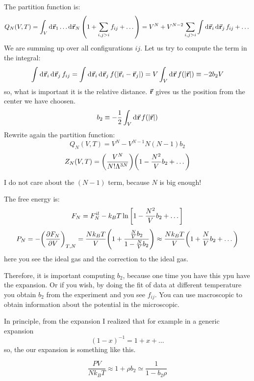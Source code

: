 \documentclass[../main/main.tex]{subfiles}
\begin{document}
The partition function is:
\begin{equation}
  Q_N (V,T) = \int_{V}^{} \dd[]{\va{r}_1} \dots \dd[]{\va{r}_N} \qty(1+ \sum_{i,j>i}^{} f_{ij} + \dots ) = V^N + V^{N-2} \sum_{i,j>i}^{} \int_{}^{} \dd[]{\va{r}_i} \dd[]{\va{r}_j} f_{ij} + \dots
\end{equation}
We are summing up over all configurations \( ij \).
Let us try to compute the term in the integral:
\begin{equation}
  \int_{}^{} \dd[]{\va{r}_i} \dd[]{\va{r}_j} f_{ij} = \int_{}^{} \dd[]{\va{r}_i} \dd[]{\va{r}_j} f \qty(\abs{\va{r}_i - \va{r}_j} )
  = V \int_{V}^{} \dd[]{\va{r}}  f \qty(\abs{\va{r}} ) \equiv -2 b_2 V
\end{equation}
so, what is important it is the relative distance. \( \va{r} \) gives us the position from the center we have choosen.
\begin{equation}
  b_2 \equiv - \frac{1}{2} \int_{V}^{} \dd[]{\va{r}}  f \qty(\abs{\va{r}} )
\end{equation}
Rewrite again the partition function:
\begin{equation}
  Q_N (V,T) = V^N - V^{N-1} N (N-1) b_2
\end{equation}
\begin{equation}
  Z_N (V,T) = \qty(\frac{V^N}{N! \Lambda ^{3N}}) \qty(1- \frac{N^2}{V}b_2 + \dots)
\end{equation}
\begin{remark}
I do not care about the \( (N-1) \) term, because \( N \) is big enough!
\end{remark}
The free energy is:
\begin{equation}
  F_N = F_N^{il} - k_B T \ln{\qty[1-\frac{N^2}{V}b_2 + \dots] }
\end{equation}
\begin{equation}
  P_N = - \qty(\pdv{F_N}{V} )_{T,N} = \frac{N k_B T}{V} \qty(1+ \frac{\frac{N}{V}b_2}{1- \frac{N}{V}b_2})
  \approx \frac{N k_B T}{V} \qty(1+\frac{N}{V}b_2 + \dots)
\end{equation}
here you see the ideal gas and the correction to the ideal gas.

Therefore, it is important computing \( b_2 \), because one time you have this ypu have the expansion. Or if you wish, by doing the fit of data at different temperature you obtain \( b_2 \) from the experiment and you see \( f_{ij} \). You can use macroscopic to obtain information about the potential in the microscopic.

In principle, from the expansion I realized that for example in a generic expansion
\begin{equation}
  (1-x)^{-1} = 1 + x + \dots
\end{equation}
so, the our expansion is something like this.

\begin{equation}
  \frac{PV}{N k_B T} \approx 1 + \rho b_2 \simeq \frac{1}{1-b_2 \rho }
\end{equation}
\end{document}
